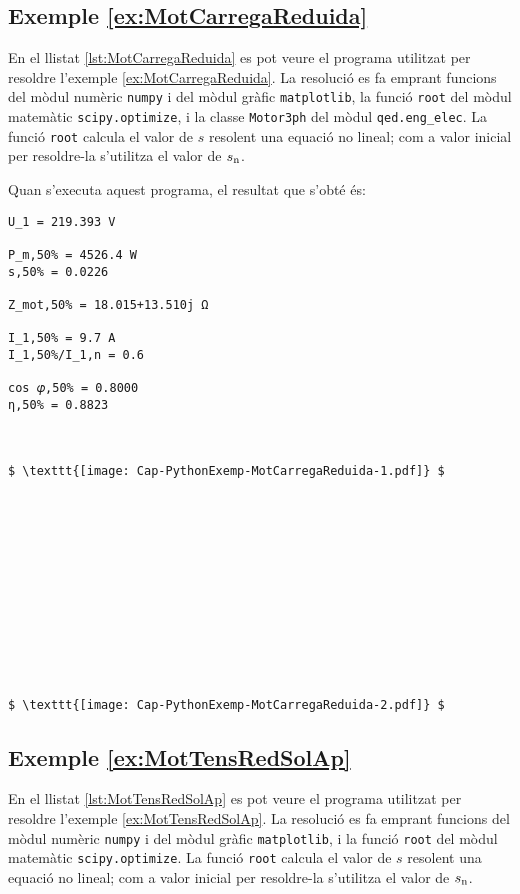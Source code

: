 \hypertarget{exemple:MotCarregaReduida}{\subsection{Exemple \ref*{ex:MotCarregaReduida} \MotCarregaReduida}}
En el llistat \vref{lst:MotCarregaReduida} es pot veure el programa utilitzat per resoldre l'exemple \vref{ex:MotCarregaReduida}. La resolució es fa emprant funcions del mòdul numèric \texttt{numpy} i del mòdul gràfic \texttt{matplotlib}, la funció \texttt{root} del mòdul matemàtic \texttt{scipy.optimize}, i la classe \texttt{Motor3ph} del mòdul \texttt{qed.eng\_elec}. La funció \texttt{root} calcula el valor de $s$ resolent una equació no lineal; com a valor inicial per resoldre-la  s'utilitza el valor de $s_\mathrm{n}$.


Quan s'executa aquest programa, el resultat que s'obté és:
\lstset{
	language=,
	numbers=none,
	frame=none
}
\begin{lstlisting}[mathescape=true]
U_1 = 219.393 V

P_m,50% = 4526.4 W
s,50% = 0.0226

Z_mot,50% = 18.015+13.510j Ω

I_1,50% = 9.7 A
I_1,50%/I_1,n = 0.6

cos 𝜑,50% = 0.8000
η,50% = 0.8823



$ \texttt{[image: Cap-PythonExemp-MotCarregaReduida-1.pdf]} $













$ \texttt{[image: Cap-PythonExemp-MotCarregaReduida-2.pdf]} $
\end{lstlisting} 


\hypertarget{exemple:MotTensRedSolAp}{\subsection{Exemple \ref*{ex:MotTensRedSolAp} \MotTensRedSolAp}}
En el llistat \vref{lst:MotTensRedSolAp} es pot veure el programa utilitzat per resoldre l'exemple \vref{ex:MotTensRedSolAp}. La resolució es fa emprant funcions del mòdul numèric \texttt{numpy} i del mòdul gràfic \texttt{matplotlib}, i la funció \texttt{root} del mòdul matemàtic \texttt{scipy.optimize}. La funció \texttt{root} calcula el valor de $s$ resolent una equació no lineal; com a valor inicial per resoldre-la  s'utilitza el valor de $s_\mathrm{n}$.


